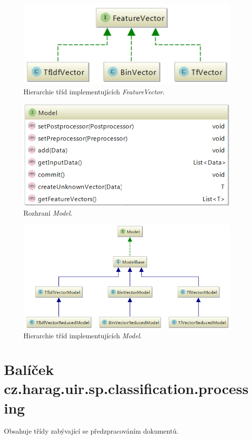 \documentclass[12pt, a4paper]{report}
\begin{document}
\begin{figure}[H]
	\centering
	\includegraphics[width=0.35\linewidth]{img-fv-h}
	\caption{Hierarchie tříd implementujících \emph{FeatureVector}.}
	\label{fig:img-fv-h}
\end{figure}

\begin{figure}[H]
	\centering
	\includegraphics[width=0.7\linewidth]{img-model-i}
	\caption{Rozhraní \emph{Model}.}
	\label{fig:img-model-i}
\end{figure}

\begin{figure}[H]
	\centering
	\includegraphics[width=0.7\linewidth]{img-model-h}
	\caption{Hierarchie tříd implementujících \emph{Model}.}
	\label{fig:img-model-h}
\end{figure}

\section{Balíček cz.harag.uir.sp.classification.processing}
Obsahuje třídy zabývající se předzpracováním dokumentů.
\end{document}
